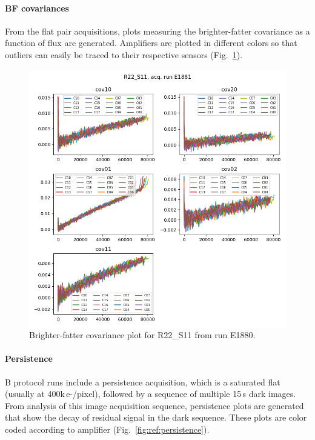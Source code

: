 \clearpage

\paragraph{BF covariances}

From the flat pair acquisitions, plots measuring the brighter-fatter covariance as a function of flux are generated. Amplifiers are plotted in different colors so that outliers can easily be traced to their respective sensors (Fig.~\ref{fig:ref:bfCov}). 

\begin{figure}
    \centering
    \includegraphics[width=0.8\linewidth]{figures/ReferenceFigures/bf_covariance_plots_LSSTCam_R22_S11_u_lsstccs_eo_bf_analysis_E1881_w_2024_35_20241105T131510Z.png}
    \caption{Brighter-fatter covariance plot for R22\_S11 from run E1880.}
    \label{fig:ref:bfCov}
\end{figure}

\clearpage
\paragraph{Persistence}

B protocol runs include a persistence acquisition, which is a saturated flat (usually at 400k\,e-/pixel), followed by a sequence of multiple 15\,s dark images. From analysis of this image acquisition sequence, persistence plots are generated that show the decay of residual signal in the dark sequence. These plots are color coded according to amplifier (Fig.~\ref{fig:ref:persistence}).

